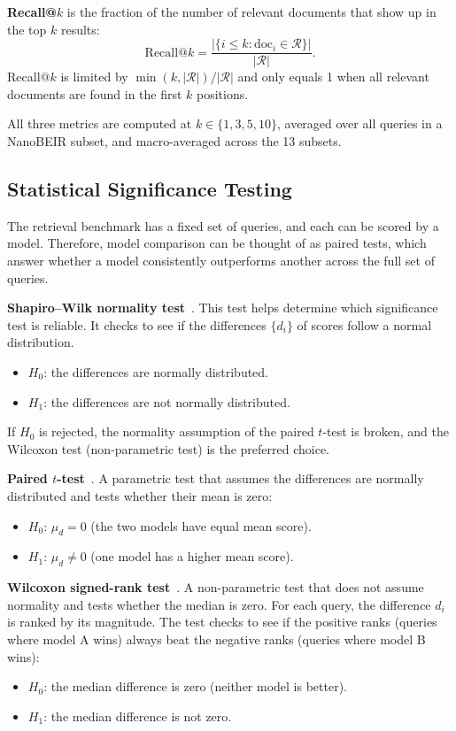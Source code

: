\textbf{Recall@$k$} is the fraction of the number of relevant documents that show up in the top $k$ results:
%
\begin{equation}
  \text{Recall}@k = \frac{|\{i \leq k : \text{doc}_i \in \mathcal{R}\}|}{|\mathcal{R}|}.
  \label{eq:recall}
\end{equation}
%
Recall@$k$ is limited by $\min(k, |\mathcal{R}|)/|\mathcal{R}|$ and only equals 1 when all relevant documents are found in the first $k$ positions.

All three metrics are computed at $k \in \{1, 3, 5, 10\}$, averaged over all queries in a NanoBEIR subset, and macro-averaged across the 13 subsets.

\subsection{Statistical Significance Testing}
\label{sec:significance_bg}

The retrieval benchmark has a fixed set of queries, and each can be scored by a model. Therefore, model comparison can be thought of as paired tests, which answer whether a model consistently outperforms another across the full set of queries.

\textbf{Shapiro--Wilk normality test}~\cite{shapiro1965analysis}. This test helps determine which significance test is reliable. It checks to see if the differences $\{d_i\}$ of scores follow a normal distribution.
\begin{itemize}
  \item $H_0$: the differences are normally distributed.
  \item $H_1$: the differences are not normally distributed.
\end{itemize}
If $H_0$ is rejected, the normality assumption of the paired $t$-test is broken, and the Wilcoxon test (non-parametric test) is the preferred choice.

\textbf{Paired $t$-test}~\cite{student1908probable}. A parametric test that assumes the differences are normally distributed and tests whether their mean is zero:
\begin{itemize}
  \item $H_0$: $\mu_d = 0$ (the two models have equal mean score).
  \item $H_1$: $\mu_d \neq 0$ (one model has a higher mean score).
\end{itemize}

\textbf{Wilcoxon signed-rank test}~\cite{wilcoxon1945individual}. A non-parametric test that does not assume normality and tests whether the median is zero. For each query, the difference $d_i$ is ranked by its magnitude. The test checks to see if the positive ranks (queries where model A wins) always beat the negative ranks (queries where model B wins):
\begin{itemize}
  \item $H_0$: the median difference is zero (neither model is better).
  \item $H_1$: the median difference is not zero.
\end{itemize}

